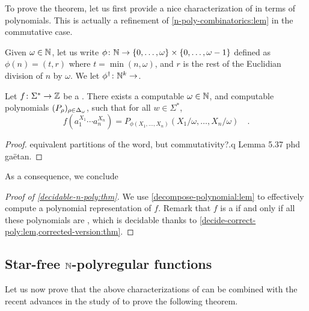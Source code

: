 To prove the theorem, let us first provide a nice characterization of
  in terms of polynomials.
This is actually a refinement of \cref{n-poly-combinatorics:lem} in the
commutative case. 

\AP Given $\omega \in \mathbb{N}$, let us write $\phi \colon \mathbb{N} \to \mathopen{\{} 0, \dots,
\omega \mathclose{\}} \times \mathopen{\{} 0, \dots, \omega - 1 \mathclose{\}}$ defined as $\phi(n) = (t, r)$ where
$t = \min(n, \omega)$, and $r$ is the rest of the Euclidian division of $n$ by
$\omega$. We let $\phi^\dagger \colon \mathbb{N}^k \to$.


\begin{lemma}
    \label{decompose-polynomial:lem}
    Let $f \colon \Sigma^* \to \mathbb{Z}$ be a 
    . There exists a computable
    $\omega \in \mathbb{N}$,
    and computable 
    polynomials $(P_{\rho})_{\rho \in \Delta_\omega}$,
    such that for all $w \in \Sigma^*$,
    \begin{equation*}
        f\left(a_1^{X_1} \cdots a_n ^{X_n}\right) = P_{\phi(X_1, \dots, X_n)} (X_1 / \omega, \dots, X_n / \omega)
        \quad .
    \end{equation*}
\end{lemma}
\begin{proof}
    equivalent partitions of the word, but commutativity?.q
    Lemma 5.37 phd gaëtan.
\end{proof}

As a consequence, we conclude 
\begin{proof}[Proof of \cref{decidable-n-poly:thm}]
    We use \cref{decompose-polynomial:lem}
    to effectively compute
    a polynomial representation of $f$. Remark that
    $f$ is a  if and only if
    all these polynomials are ,
    which is decidable thanks to
    \cref{decide-correct-poly:lem,corrected-version:thm}.
\end{proof}



\subsection{Star-free $\mathbb{N}$-polyregular functions}
\label{star-free:sec}


Let us now prove that the above characterizations of 
 can be combined with the recent advances in
the study of  \cite{LOPEZ23b} to prove the
following theorem.

